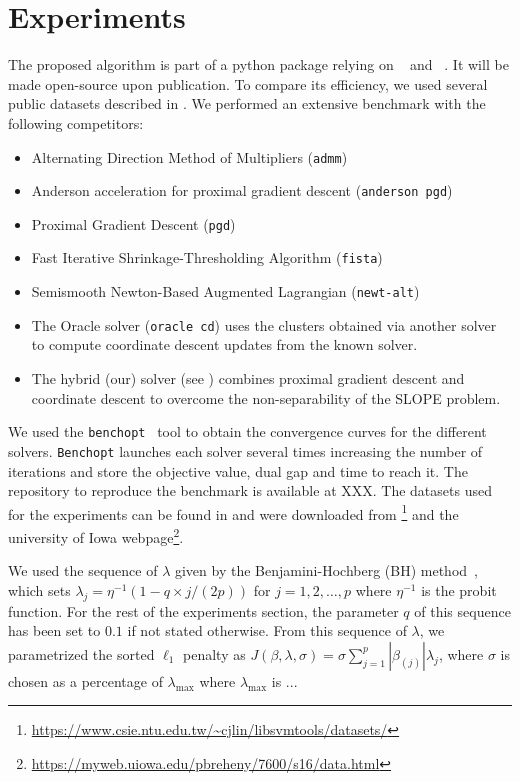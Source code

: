 \section{Experiments}\label{sec:experiments}

The proposed algorithm is part of a python package relying on ~\parencite{harris2020} and ~\parencite{lam2015}.
It will be made open-source upon publication. To compare its efficiency, we used several public datasets described in .
We performed an extensive benchmark with the following competitors:
\begin{itemize}[noitemsep]
  \item Alternating Direction Method of Multipliers (\texttt{admm})~\parencite{boyd2010}
  \item Anderson acceleration for proximal gradient descent (\texttt{anderson pgd})~\parencite{zhang2020}
  \item Proximal Gradient Descent (\texttt{pgd})~\parencite{combettes2005}
  \item Fast Iterative Shrinkage-Thresholding Algorithm (\texttt{fista})~\parencite{beck2009}
  \item Semismooth Newton-Based Augmented Lagrangian (\texttt{newt-alt})~\parencite{Ziyan2019}
  \item The Oracle solver (\texttt{oracle cd}) uses the clusters obtained via another
        solver to compute coordinate descent updates from the known solver.
  \item The hybrid (our) solver (see ) combines proximal gradient descent
        and coordinate descent to overcome the non-separability of the SLOPE problem.
\end{itemize}

We used the \texttt{benchopt}~\parencite{moreau2022benchopt} tool to obtain the convergence curves for the different solvers.
\texttt{Benchopt} launches each solver several times increasing the number of iterations and store the objective value, dual gap and time to reach it.
The repository to reproduce the benchmark is available at XXX.
The datasets used for the experiments can be found in  and were downloaded from \footnote{\url{https://www.csie.ntu.edu.tw/~cjlin/libsvmtools/datasets/}} and the university of Iowa webpage\footnote{\url{https://myweb.uiowa.edu/pbreheny/7600/s16/data.html}}.

We used the sequence of $\lambda$ given by the Benjamini-Hochberg (BH) method~\parencite{bogdan2015},
which sets $\lambda_j = \eta^{-1}(1 - q\times j / (2p))$ for $j=1, 2, \hdots, p$ where $\eta^{-1}$ is the probit function. 
For the rest of the experiments section, the parameter $q$ of this sequence has been set to $0.1$ if not stated otherwise.
From this sequence of $\lambda$, we parametrized the sorted $\ell_1$ penalty as $J(\beta, \lambda, \sigma) = \sigma \sum_{j=1}^p |\beta_{(j)}| \lambda_j$, where $\sigma$ is chosen as a percentage of $\lambda_{\text{max}}$ where $\lambda_{\text{max}}$ is ...

